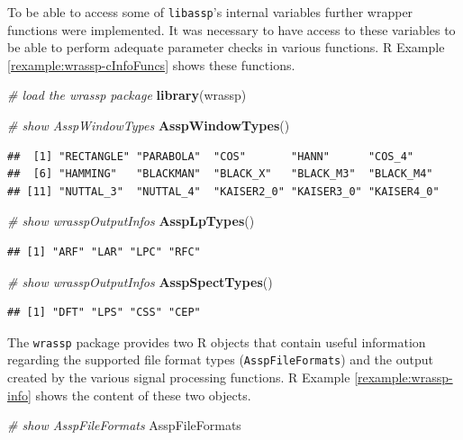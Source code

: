 \documentclass[]{book}
\newenvironment{Shaded}{\begin{snugshade}}{\end{snugshade}}
\newcommand{\CommentTok}[1]{\textcolor[rgb]{0.56,0.35,0.01}{\textit{#1}}}
\newcommand{\KeywordTok}[1]{\textcolor[rgb]{0.13,0.29,0.53}{\textbf{#1}}}
\newcommand{\NormalTok}[1]{#1}
\theoremstyle{definition}
\theoremstyle{definition}
\theoremstyle{definition}
\theoremstyle{remark}
\begin{document}
To be able to access some of \texttt{libassp}'s internal variables
further wrapper functions were implemented. It was necessary to have
access to these variables to be able to perform adequate parameter
checks in various functions. R Example \ref{rexample:wrassp-cInfoFuncs}
shows these functions.

\begin{Shaded}
\begin{Highlighting}[]
\CommentTok{# load the wrassp package}
\KeywordTok{library}\NormalTok{(wrassp)}

\CommentTok{# show AsspWindowTypes}
\KeywordTok{AsspWindowTypes}\NormalTok{()}
\end{Highlighting}
\end{Shaded}

\begin{verbatim}
##  [1] "RECTANGLE" "PARABOLA"  "COS"       "HANN"      "COS_4"    
##  [6] "HAMMING"   "BLACKMAN"  "BLACK_X"   "BLACK_M3"  "BLACK_M4" 
## [11] "NUTTAL_3"  "NUTTAL_4"  "KAISER2_0" "KAISER3_0" "KAISER4_0"
\end{verbatim}

\begin{Shaded}
\begin{Highlighting}[]
\CommentTok{# show wrasspOutputInfos}
\KeywordTok{AsspLpTypes}\NormalTok{()}
\end{Highlighting}
\end{Shaded}

\begin{verbatim}
## [1] "ARF" "LAR" "LPC" "RFC"
\end{verbatim}

\begin{Shaded}
\begin{Highlighting}[]
\CommentTok{# show wrasspOutputInfos}
\KeywordTok{AsspSpectTypes}\NormalTok{()}
\end{Highlighting}
\end{Shaded}

\begin{verbatim}
## [1] "DFT" "LPS" "CSS" "CEP"
\end{verbatim}

The \texttt{wrassp} package provides two R objects that contain useful
information regarding the supported file format types
(\texttt{AsspFileFormats}) and the output created by the various signal
processing functions. R Example \ref{rexample:wrassp-info} shows the
content of these two objects.

\begin{Shaded}
\begin{Highlighting}[]
\CommentTok{# show AsspFileFormats}
\NormalTok{AsspFileFormats}
\end{Highlighting}
\end{Shaded}
\end{document}
